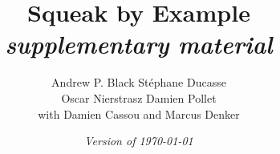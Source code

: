 \documentclass[a4paper,10pt,twoside]{book}
\begin{document}
\frontmatter
\setcounter{page}{1}
\pagestyle{headings}
\author{
	Andrew P. Black\quad
	St\'ephane Ducasse\\[1ex]
	Oscar Nierstrasz\quad
	Damien Pollet
	\\[4ex]
	with Damien Cassou and Marcus Denker}
\title{\Huge\bf Squeak by Example\\[1ex]
\normalsize{\emph{supplementary material}}}
\isodate
\date{\emph{Version of \today}}
\maketitle
\tableofcontents
\sloppy %
\mainmatter







\printindex
\end{document}
